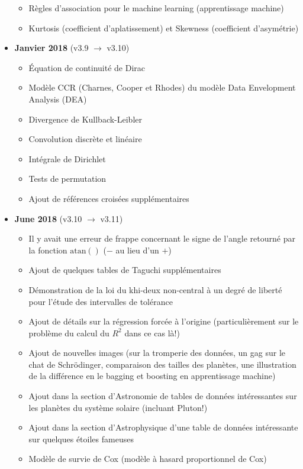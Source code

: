\documentclass[12pt,a4paper,twoside,openright]{report}
\theoremstyle{definition}
\theoremstyle{itexmp}
\numberwithin{equation}{section}
\begin{document}
\begin{itemize}
\begin{itemize}[noitemsep]
				\item Règles d'association pour le machine learning (apprentissage machine)
				\item Kurtosis (coefficient d'aplatissement) et Skewness (coefficient d'asymétrie)
			\end{itemize}
		\item \textbf{Janvier 2018} (v3.9 $\rightarrow$ v3.10)
			\begin{itemize}[noitemsep]
				\item Équation de continuité de Dirac
				\item Modèle CCR (Charnes, Cooper et Rhodes) du modèle Data Envelopment Analysis (DEA)
				\item Divergence de Kullback-Leibler
				\item Convolution discrète et linéaire
				\item Intégrale de Dirichlet
				\item Tests de permutation
				\item Ajout de références croisées supplémentaires
			\end{itemize}
			\item \textbf{June 2018} (v3.10 $\rightarrow$ v3.11)
			\begin{itemize}[noitemsep]
				\item Il y avait une erreur de frappe concernant le signe de l'angle retourné par la fonction $\mathrm{atan()}$ ($-$ au lieu d'un $+$)
				\item Ajout de quelques tables de Taguchi supplémentaires
				\item Démonstration de la loi du khi-deux non-central à un degré de liberté pour l'étude des intervalles de tolérance
				\item Ajout de détails sur la régression forcée à l'origine (particulièrement sur le problème du calcul du $R^2$ dans ce cas là!)
				\item Ajout de nouvelles images (sur la tromperie des données, un gag sur le chat de Schrödinger, comparaison des tailles des planètes, une illustration de la différence en le bagging et boosting en apprentissage machine)
				\item Ajout dans la section d'Astronomie de tables de données intéressantes sur les planètes du système solaire (incluant Pluton!)
				\item Ajout dans la section d'Astrophysique d'une table de données intéressante sur quelques étoiles fameuses
				\item Modèle de survie de Cox (modèle à hasard proportionnel de Cox)

\end{itemize}
\end{itemize}
\end{document}
